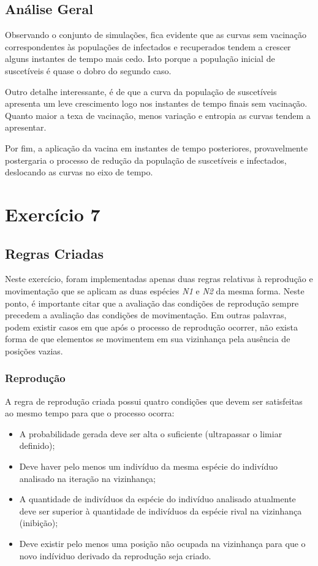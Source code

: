 \documentclass[a4paper, 12pt]{article}
\begin{document}
\subsection*{Análise Geral}

Observando o conjunto de simulações, fica evidente que as curvas sem vacinação correspondentes às populações de infectados e recuperados tendem a crescer alguns instantes de tempo mais cedo. Isto porque a população inicial de suscetíveis é quase o dobro do segundo caso.

Outro detalhe interessante, é de que a curva da população de suscetíveis apresenta um leve crescimento logo nos instantes de tempo finais sem vacinação. Quanto maior a texa de vacinação, menos variação e entropia as curvas tendem a apresentar.

Por fim, a aplicação da vacina em instantes de tempo posteriores, provavelmente postergaria o processo de redução da população de suscetíveis e infectados, deslocando as curvas no eixo de tempo.

\pagebreak

\section*{Exercício 7}

\subsection*{Regras Criadas}

Neste exercício, foram implementadas apenas duas regras relativas à reprodução e movimentação que se aplicam as duas espécies \emph{N1} e \emph{N2} da mesma forma. Neste ponto, é importante citar que a avaliação das condições de reprodução sempre precedem a avaliação das condições de movimentação. Em outras palavras, podem existir casos em que após o processo de reprodução ocorrer, não exista forma de que elementos se movimentem em sua vizinhança pela ausência de posições vazias.

\subsubsection*{Reprodução}

A regra de reprodução criada possui quatro condições que devem ser satisfeitas ao mesmo tempo para que o processo ocorra:

\begin{itemize}
    \item A probabilidade gerada deve ser alta o suficiente (ultrapassar o limiar definido);
    \item Deve haver pelo menos um indivíduo da mesma espécie do indivíduo analisado na iteração na vizinhança;
    \item A quantidade de indivíduos da espécie do indivíduo analisado atualmente deve ser superior à quantidade de indivíduos da espécie rival na vizinhança (inibição);
    \item Deve existir pelo menos uma posição não ocupada na vizinhança para que o novo indíviduo derivado da reprodução seja criado.
\end{itemize}
\end{document}
